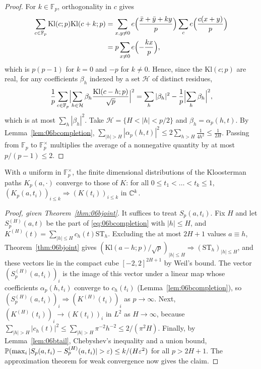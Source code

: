 \begin{proof}
For $k\in\mathbb{F}_p$, orthogonality in $c$ gives
\begin{align*}
\sum_{c\in\mathbb{F}_p}\mathrm{Kl}(c;p)\mathrm{Kl}(c+k;p)&=\sum_{x,y\ne0}e\Bigl(\frac{\bar x+\bar y+ky}{p}\Bigr)\sum_ce\Bigl(\frac{c(x+y)}{p}\Bigr)\\
&=p\sum_{x\ne0}e\Bigl(-\frac{kx}{p}\Bigr),
\end{align*}
which is $p(p-1)$ for $k=0$ and $-p$ for $k\ne0$. Hence, since the $\mathrm{Kl}(c;p)$ are real, for any coefficients $\beta_h$ indexed by a set $\mathcal{H}$ of distinct residues,
\[
\frac1p\sum_{c\in\mathbb{F}_p}\Bigl|\sum_{h\in\mathcal{H}}\beta_h\frac{\mathrm{Kl}(c-h;p)}{\sqrt p}\Bigr|^2=\sum_{h}|\beta_h|^2-\frac1p\Bigl|\sum_h\beta_h\Bigr|^2,
\]
which is at most $\sum_h|\beta_h|^2$. Take $\mathcal{H}=\{H<|h|<p/2\}$ and $\beta_h=\alpha_p(h,t)$. By Lemma~\ref{lem:06bcompletion}, $\sum_{|h|>H}|\alpha_p(h,t)|^2\le2\sum_{h>H}\frac1{4h^2}\le\frac1{2H}$. Passing from $\mathbb{F}_p$ to $\mathbb{F}_p^\times$ multiplies the average of a nonnegative quantity by at most $p/(p-1)\le2$.
\end{proof}

\begin{theorem}\label{thm:06bks}
With $a$ uniform in $\mathbb{F}_p^\times$, the finite dimensional distributions of the Kloosterman paths $K_p(a,\cdot)$ converge to those of $K$: for all $0\le t_1<\dots<t_k\le1$, $(K_p(a,t_i))_{i\le k}\Rightarrow(K(t_i))_{i\le k}$ in $\mathbb{C}^k$.
\end{theorem}

\begin{proof}[Proof, given Theorem~\ref{thm:06bjoint}]
It suffices to treat $S_p(a,t_i)$. Fix $H$ and let $S^{(H)}_p(a,t)$ be the part of \eqref{eq:06bcompletion} with $|h|\le H$, and $K^{(H)}(t)=\sum_{|h|\le H}c_h(t)\mathrm{ST}_h$. Excluding the at most $2H+1$ values $a\equiv h$, Theorem~\ref{thm:06bjoint} gives $(\mathrm{Kl}(a-h;p)/\sqrt p)_{|h|\le H}\Rightarrow(\mathrm{ST}_h)_{|h|\le H}$, and these vectors lie in the compact cube $[-2,2]^{2H+1}$ by Weil's bound. The vector $(S^{(H)}_p(a,t_i))_i$ is the image of this vector under a linear map whose coefficients $\alpha_p(h,t_i)$ converge to $c_h(t_i)$ (Lemma~\ref{lem:06bcompletion}), so $(S^{(H)}_p(a,t_i))_i\Rightarrow(K^{(H)}(t_i))_i$ as $p\to\infty$. Next, $(K^{(H)}(t_i))_i\to(K(t_i))_i$ in $L^2$ as $H\to\infty$, because $\sum_{|h|>H}|c_h(t)|^2\le\sum_{|h|>H}\pi^{-2}h^{-2}\le 2/(\pi^2H)$. Finally, by Lemma~\ref{lem:06btail}, Chebyshev's inequality and a union bound, $\Prob(\max_i|S_p(a,t_i)-S^{(H)}_p(a,t_i)|>\varepsilon)\le k/(H\varepsilon^2)$ for all $p>2H+1$. The approximation theorem for weak convergence \cite[Theorem~4.2]{billingsley1968} now gives the claim.
\end{proof}

